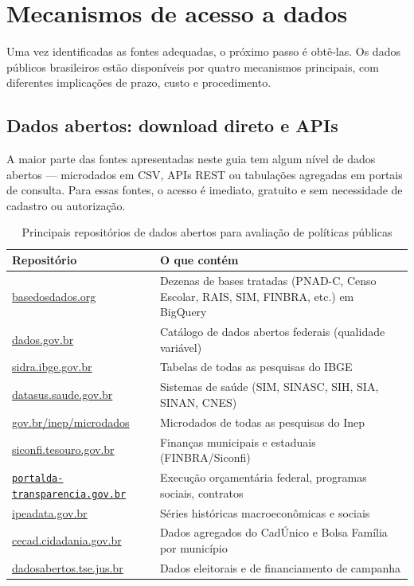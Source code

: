 \section{Mecanismos de acesso a dados}

Uma vez identificadas as fontes adequadas, o próximo passo é obtê-las. Os dados públicos brasileiros estão disponíveis por quatro mecanismos principais, com diferentes implicações de prazo, custo e procedimento.

\subsection{Dados abertos: download direto e APIs}

A maior parte das fontes apresentadas neste guia tem algum nível de dados abertos --- microdados em CSV, APIs REST ou tabulações agregadas em portais de consulta. Para essas fontes, o acesso é imediato, gratuito e sem necessidade de cadastro ou autorização.

\begin{table}[H]
\centering
\caption{Principais repositórios de dados abertos para avaliação de políticas públicas}
\label{tab:repositorios}
\begin{tabularx}{\textwidth}{@{} >{\raggedright\arraybackslash}p{4.5cm} X @{}}
\toprule
\textbf{Repositório} & \textbf{O que contém} \\
\midrule
\url{basedosdados.org}       & Dezenas de bases tratadas (PNAD-C, Censo Escolar, RAIS, SIM, FINBRA, etc.) em BigQuery \\
\url{dados.gov.br}           & Catálogo de dados abertos federais (qualidade variável) \\
\url{sidra.ibge.gov.br}      & Tabelas de todas as pesquisas do IBGE \\
\url{datasus.saude.gov.br}   & Sistemas de saúde (SIM, SINASC, SIH, SIA, SINAN, CNES) \\
\url{gov.br/inep/microdados} & Microdados de todas as pesquisas do Inep \\
\url{siconfi.tesouro.gov.br} & Finanças municipais e estaduais (FINBRA/Siconfi) \\
\href{https://portaldatransparencia.gov.br}{\nolinkurl{portalda-transparencia.gov.br}} & Execução orçamentária federal, programas sociais, contratos \\
\url{ipeadata.gov.br}        & Séries históricas macroeconômicas e sociais \\
\url{cecad.cidadania.gov.br} & Dados agregados do CadÚnico e Bolsa Família por município \\
\url{dadosabertos.tse.jus.br} & Dados eleitorais e de financiamento de campanha \\
\bottomrule
\end{tabularx}
\end{table}

